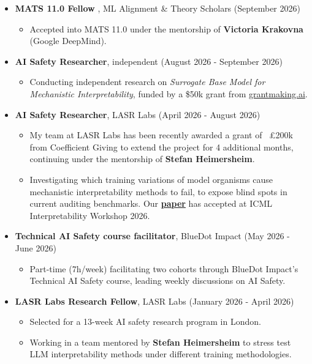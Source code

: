\documentclass[a4paper,9pt]{article}
\newcommand{\cvsection}[2]{
    \vspace{0.3cm} %
    \noindent {\large \textbf{#1}} %
    \begin{itemize}
        \renewcommand{\labelitemi}{}
        \small #2 %
    \end{itemize}
}
\begin{document}
\cvsection{Professional Experience}{
    \item \textbf{MATS 11.0 Fellow }, ML Alignment \& Theory Scholars (September 2026)
    \begin{itemize}
        \item Accepted into MATS 11.0 under the mentorship of \textbf{Victoria Krakovna} (Google DeepMind).
    \end{itemize}

    \item \textbf{AI Safety Researcher}, independent (August 2026 - September 2026)
    \begin{itemize}
        \item Conducting independent research on \textit{Surrogate Base Model for Mechanistic Interpretability}, funded by a \$50k grant from \href{https://app.grantmaking.ai/projects/f6f8c4ea-ad05-48a4-9d06-a800d176b12e}{grantmaking.ai}.
    \end{itemize}

    \item \textbf{AI Safety Researcher}, LASR Labs (April 2026 - August 2026)
    \begin{itemize}
        \item My team at LASR Labs has been recently awarded a grant of ~£200k from Coefficient Giving to extend the project for 4 additional months, continuing under the mentorship of \textbf{Stefan Heimersheim}.
        \item Investigating which training variations of model organisms cause mechanistic interpretability methods to fail, to expose blind spots in current auditing benchmarks. Our \href{https://arxiv.org/abs/2607.01033}{\textbf{paper}} has accepted at ICML Interpretability Workshop 2026.
    \end{itemize}

    \item \textbf{Technical AI Safety course facilitator}, BlueDot Impact (May 2026 - June 2026)
    \begin{itemize}
        \item Part-time (7h/week) facilitating two cohorts through BlueDot Impact's Technical AI Safety course, leading weekly discussions on AI Safety.
    \end{itemize}

    \item \textbf{LASR Labs Research Fellow}, LASR Labs (January 2026 - April 2026)
    \begin{itemize}
        \item Selected for a 13-week AI safety research program in London.
        \item Working in a team mentored by \textbf{Stefan Heimersheim} to stress test LLM interpretability methods under different training methodologies. 
    \end{itemize}

}
\end{document}

